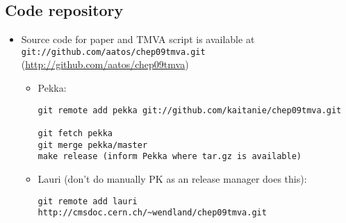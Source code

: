 \begin{appendix}
\begin{comment}
\section{WORKING NOTES}
{\bf Suggested  responsibility}: 
\begin{itemize}
\item[aatos]
Aatos: editor, NN classifiers; 
\item Pekka: release manager, git consulting, PROOF
\begin{itemize}
\item git consulting: OK (setting up workflow and repositories, user
  training, documentation, software installation)
\item PROOF: I didn't see PROOF mentioned anywhere in the TMVA
  documentation. Is it supported? If not, then I don't have resources
  to do it (lesson learned in the past: PROOF-enabling an analysis
  code can be a major undertaking...)
\end{itemize}
\item Sami: MC data, 
\item Lauri 1-prog physics
\item Ritva: 
\item Tomas: Ametisti
\item Tapio: 
\item Matti:a mechanism to work with variables 
\item Veikko:
\end{itemize}
\end{comment}
\subsection{Code repository}

\begin{itemize}
\item Source code for paper and TMVA script  is available at 
{\tt git://github.com/aatos/chep09tmva.git} (\url{http://github.com/aatos/chep09tmva})

\begin{itemize}
\item Pekka:
\begin{verbatim}
git remote add pekka git://github.com/kaitanie/chep09tmva.git

git fetch pekka
git merge pekka/master
make release (inform Pekka where tar.gz is available)
\end{verbatim}

\item Lauri (don't do manually PK as an release manager does this):
\begin{verbatim}
git remote add lauri http://cmsdoc.cern.ch/~wendland/chep09tmva.git


\end{verbatim}
\end{itemize}
\end{itemize}
\end{appendix}
